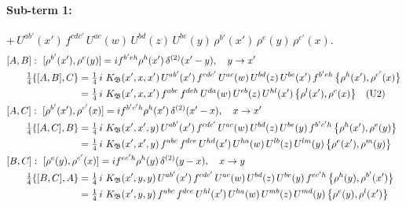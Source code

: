 \documentclass[10pt]{article}
\numberwithin{equation}{section}
\begin{document}
\paragraph{Sub-term 1:} $+\,U^{ab'}(x')\,f^{cdc'}\,U^{ac}(w)\,U^{bd}(z)\,U^{be}(y)\,\rho^{b'}(x')\,\rho^{e}(y)\,\rho^{c'}(x)$.
\begin{align}
&[A,B]:\ [\rho^{b'}(x'),\rho^{e}(y)]=i f^{b'eh}\rho^{h}(x')\,\delta^{(2)}(x'-y),\quad y\to x'\notag\\
&\qquad \tfrac14\{[A,B],C\}=\tfrac14\,i\,\,K_{\mathfrak B}(x',x,x')\,U^{ab'}(x')\,f^{cdc'}\,U^{ac}(w)\,U^{bd}(z)\,U^{be}(x')\,f^{b'eh}\,\big\{\rho^{h}(x'),\rho^{c'}(x)\big\}\notag\\
&\qquad\phantom{\tfrac14\{[A,B],C\}}=\tfrac14\,i\,\,K_{\mathfrak B}(x',x,x')\,f^{abc}\,f^{deh}\,U^{da}(w)\,U^{eb}(z)\,U^{hl}(x')\,\big\{\rho^{l}(x'),\rho^{c}(x)\big\}\quad\text{(U2)}
\label{R:eq:GI.IV-1-AB}\\
&[A,C]:\ [\rho^{b'}(x'),\rho^{c'}(x)]=i f^{b'c'h}\rho^{h}(x')\,\delta^{(2)}(x'-x),\quad x\to x'\notag\\
&\qquad \tfrac14\{[A,C],B\}=\tfrac14\,i\,\,K_{\mathfrak B}(x',x',y)\,U^{ab'}(x')\,f^{cdc'}\,U^{ac}(w)\,U^{bd}(z)\,U^{be}(y)\,f^{b'c'h}\,\big\{\rho^{h}(x'),\rho^{e}(y)\big\}\notag\\
&\qquad\phantom{\tfrac14\{[A,C],B\}}=\tfrac14\,i\,\,K_{\mathfrak B}(x',x',y)\,f^{abc}\,f^{dce}\,U^{hd}(x')\,U^{ha}(w)\,U^{lb}(z)\,U^{lm}(y)\,\big\{\rho^{e}(x'),\rho^{m}(y)\big\}
\label{R:eq:GI.IV-1-AC}\\
&[B,C]:\ [\rho^{e}(y),\rho^{c'}(x)]=i f^{ec'h}\rho^{h}(y)\,\delta^{(2)}(y-x),\quad x\to y\notag\\
&\qquad \tfrac14\{[B,C],A\}=\tfrac14\,i\,\,K_{\mathfrak B}(x',y,y)\,U^{ab'}(x')\,f^{cdc'}\,U^{ac}(w)\,U^{bd}(z)\,U^{be}(y)\,f^{ec'h}\,\big\{\rho^{h}(y),\rho^{b'}(x')\big\}\notag\\
&\qquad\phantom{\tfrac14\{[B,C],A\}}=\tfrac14\,i\,\,K_{\mathfrak B}(x',y,y)\,f^{abc}\,f^{dce}\,U^{hl}(x')\,U^{ha}(w)\,U^{mb}(z)\,U^{md}(y)\,\big\{\rho^{e}(y),\rho^{l}(x')\big\}
\label{R:eq:GI.IV-1-BC}
\end{align}
\end{document}
